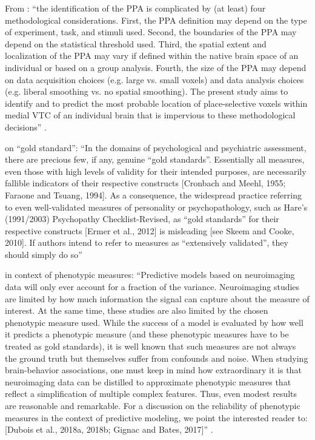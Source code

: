 From \citep{weiner2018defining}: ``the identification of the PPA is complicated by (at least) four
methodological considerations. First, the PPA definition may depend on the type
of experiment, task, and stimuli used. Second, the boundaries of the PPA may
depend on the statistical threshold used. Third, the spatial extent and
localization of the PPA may vary if defined within the native brain space of an
individual or based on a group analysis. Fourth, the size of the PPA may depend
on data acquisition choices (e.g. large vs. small voxels) and data analysis
choices (e.g. liberal smoothing vs. no spatial smoothing). The present study
aims to identify and to predict the most probable location of place-selective
voxels within medial VTC of an individual brain that is impervious to these
methodological decisions'' \citep{weiner2018defining}.

\citet{lilienfeld2015fifty} on ``gold standard'': ``In the domains of
psychological and psychiatric assessment, there are precious few, if any,
genuine ``gold standards''. Essentially all measures, even those with high
levels of validity for their intended purposes, are necessarily fallible
indicators of their respective constructs [Cronbach and Meehl, 1955; Faraone and
Tsuang, 1994]. As a consequence, the widespread practice referring to even
well-validated measures of personality or psychopathology, such as Hare’s
(1991/2003) Psychopathy Checklist-Revised, as ``gold standards'' for their
respective constructs [Ermer et al., 2012] is misleading [see Skeem and Cooke,
2010]. If authors intend to refer to measures as ``extensively validated'', they
should simply do so'' \citep{lilienfeld2015fifty}

\citet{scheinost2019ten} in context of phenotypic measures: ``Predictive models
based on neuroimaging data will only ever account for a fraction of the
variance. Neuroimaging studies are limited by how much information the signal
can capture about the measure of interest. At the same time, these studies are
also limited by the chosen phenotypic measure used.  While the success of a
model is evaluated by how well it predicts a phenotypic measure (and these
phenotypic measures have to be treated as gold standards), it is well known that
such measures are not always the ground truth but themselves suffer from
confounds and noise.  When studying brain-behavior associations, one must keep
in mind how extraordinary it is that neuroimaging data can be distilled to
approximate phenotypic measures that reflect a simplification of multiple
complex features. Thus, even modest results are reasonable and remarkable. For
a discussion on the reliability of phenotypic measures in the context of
predictive modeling, we point the interested reader to: [Dubois et al., 2018a,
2018b; Gignac and Bates, 2017]'' \citep{scheinost2019ten}.


